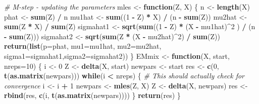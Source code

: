 \documentclass[]{article}
\newenvironment{Shaded}{\begin{snugshade}}{\end{snugshade}}
\newcommand{\CommentTok}[1]{\textcolor[rgb]{0.56,0.35,0.01}{\textit{#1}}}
\newcommand{\ControlFlowTok}[1]{\textcolor[rgb]{0.13,0.29,0.53}{\textbf{#1}}}
\newcommand{\DataTypeTok}[1]{\textcolor[rgb]{0.13,0.29,0.53}{#1}}
\newcommand{\DecValTok}[1]{\textcolor[rgb]{0.00,0.00,0.81}{#1}}
\newcommand{\KeywordTok}[1]{\textcolor[rgb]{0.13,0.29,0.53}{\textbf{#1}}}
\newcommand{\NormalTok}[1]{#1}
\newcommand{\OperatorTok}[1]{\textcolor[rgb]{0.81,0.36,0.00}{\textbf{#1}}}
\newcommand{\StringTok}[1]{\textcolor[rgb]{0.31,0.60,0.02}{#1}}
\begin{document}
\begin{Shaded}
\begin{Highlighting}[]
\CommentTok{# M-step - updating the parameters}
\NormalTok{mles <-}\StringTok{ }\ControlFlowTok{function}\NormalTok{(Z, X) \{}
\NormalTok{  n <-}\StringTok{ }\KeywordTok{length}\NormalTok{(X)}
\NormalTok{  phat <-}\StringTok{ }\KeywordTok{sum}\NormalTok{(Z) }\OperatorTok{/}\StringTok{ }\NormalTok{n}
\NormalTok{  mu1hat <-}\StringTok{ }\KeywordTok{sum}\NormalTok{((}\DecValTok{1} \OperatorTok{-}\StringTok{ }\NormalTok{Z) }\OperatorTok{*}\StringTok{ }\NormalTok{X) }\OperatorTok{/}\StringTok{ }\NormalTok{(n }\OperatorTok{-}\StringTok{ }\KeywordTok{sum}\NormalTok{(Z))}
\NormalTok{  mu2hat <-}\StringTok{ }\KeywordTok{sum}\NormalTok{(Z }\OperatorTok{*}\StringTok{ }\NormalTok{X) }\OperatorTok{/}\StringTok{ }\KeywordTok{sum}\NormalTok{(Z)}
\NormalTok{  sigmahat1 <-}\StringTok{ }\KeywordTok{sqrt}\NormalTok{(}\KeywordTok{sum}\NormalTok{((}\DecValTok{1} \OperatorTok{-}\StringTok{ }\NormalTok{Z) }\OperatorTok{*}\StringTok{ }\NormalTok{(X }\OperatorTok{-}\StringTok{ }\NormalTok{mu1hat)}\OperatorTok{^}\DecValTok{2}\NormalTok{ ) }\OperatorTok{/}\StringTok{ }\NormalTok{(n }\OperatorTok{-}\StringTok{ }\KeywordTok{sum}\NormalTok{(Z)))}
\NormalTok{  sigmahat2 <-}\StringTok{ }\KeywordTok{sqrt}\NormalTok{(}\KeywordTok{sum}\NormalTok{(Z }\OperatorTok{*}\StringTok{ }\NormalTok{(X }\OperatorTok{-}\StringTok{ }\NormalTok{mu2hat)}\OperatorTok{^}\DecValTok{2}\NormalTok{) }\OperatorTok{/}\StringTok{ }\KeywordTok{sum}\NormalTok{(Z))}
  \KeywordTok{return}\NormalTok{(}\KeywordTok{list}\NormalTok{(}\DataTypeTok{p=}\NormalTok{phat, }\DataTypeTok{mu1=}\NormalTok{mu1hat, }\DataTypeTok{mu2=}\NormalTok{mu2hat, }\DataTypeTok{sigma1=}\NormalTok{sigmahat1,}\DataTypeTok{sigma2=}\NormalTok{sigmahat2))}
\NormalTok{\}}
\NormalTok{EMmix <-}\StringTok{ }\ControlFlowTok{function}\NormalTok{(X, start, }\DataTypeTok{nreps=}\DecValTok{10}\NormalTok{) \{}
\NormalTok{  i <-}\StringTok{ }\DecValTok{0}
\NormalTok{  Z <-}\StringTok{ }\KeywordTok{delta}\NormalTok{(X, start)}
\NormalTok{  newpars <-}\StringTok{ }\NormalTok{start}
\NormalTok{  res <-}\StringTok{ }\KeywordTok{c}\NormalTok{(}\DecValTok{0}\NormalTok{, }\KeywordTok{t}\NormalTok{(}\KeywordTok{as.matrix}\NormalTok{(newpars)))}
  \ControlFlowTok{while}\NormalTok{(i }\OperatorTok{<}\StringTok{ }\NormalTok{nreps) \{     }
  \CommentTok{# This should actually check for convergence}
\NormalTok{    i <-}\StringTok{ }\NormalTok{i }\OperatorTok{+}\StringTok{ }\DecValTok{1}
\NormalTok{    newpars <-}\StringTok{ }\KeywordTok{mles}\NormalTok{(Z, X)}
\NormalTok{    Z <-}\StringTok{ }\KeywordTok{delta}\NormalTok{(X, newpars)}
\NormalTok{    res <-}\StringTok{ }\KeywordTok{rbind}\NormalTok{(res, }\KeywordTok{c}\NormalTok{(i, }\KeywordTok{t}\NormalTok{(}\KeywordTok{as.matrix}\NormalTok{(newpars))))}
\NormalTok{  \}}
  \KeywordTok{return}\NormalTok{(res)}
\NormalTok{\}}
\end{Highlighting}
\end{Shaded}
\end{document}
